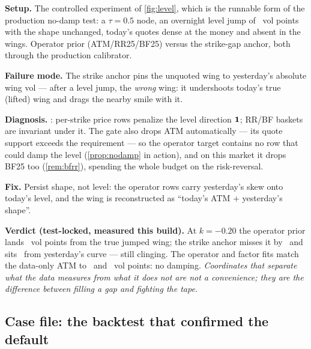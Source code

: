 \documentclass[11pt]{article}
\begin{document}
\begin{example}[title={Case file: the jump the strike anchor damped}]
\textbf{Setup.}  The controlled experiment of \cref{fig:level}, which
is the runnable form of the production no-damp test: a $\tau=0.5$
node, an overnight level jump of \pfljump\ vol points with the shape
unchanged, today's quotes dense at the money and absent in the wings.
Operator prior (ATM/RR25/BF25) versus the strike-gap anchor, both
through the production calibrator.

\textbf{Failure mode.}  The strike anchor pins the unquoted wing to
yesterday's absolute wing vol --- after a level jump, the \emph{wrong}
wing: it undershoots today's true (lifted) wing and drags the nearby
smile with it.

\textbf{Diagnosis.}  : per-strike price rows
penalize the level direction $\mathbf{1}$; RR/BF baskets are invariant under
it.  The gate also drops ATM automatically --- its quote support
exceeds the requirement --- so the operator target contains no row
that could damp the level (\cref{prop:nodamp} in action), and on this
market it drops BF25 too (\cref{rem:bfrr}), spending the whole budget
on the risk-reversal.

\textbf{Fix.}  Persist shape, not level: the operator rows carry
yesterday's skew onto today's level, and the wing is reconstructed as
``today's ATM $+$ yesterday's shape''.

\textbf{Verdict (test-locked, measured this build).}  At $k=-0.20$
the operator prior lands \pflopwingerrdeep\ vol points from the true
jumped wing; the strike anchor misses it by \pflsgwingerrdeep\ and
sits \pflsgoldgap\ from yesterday's curve --- still clinging.  The
operator and factor fits match the data-only ATM to \pflatmopgap\ and
\pflatmfacgap\ vol points: no damping.  \emph{Coordinates that
separate what the data measures from what it does not are not a
convenience; they are the difference between filling a gap and
fighting the tape.}
\end{example}

\subsection{Case file: the backtest that confirmed the default}
\end{document}
